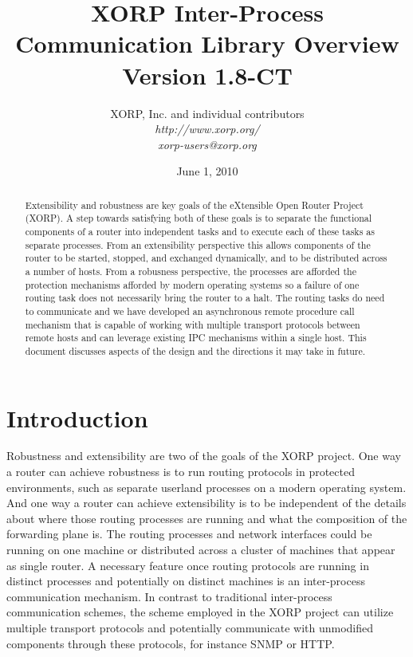 \documentclass[11pt]{article}
\begin{document}
\title{XORP Inter-Process Communication Library Overview \\
\vspace{1ex}
Version 1.8-CT}
\author{ XORP, Inc. and individual contributors		\\
         {\it http://www.xorp.org/}			\\
	 {\it xorp-users@xorp.org}
}
\date{June 1, 2010}

\maketitle


\begin{abstract}

Extensibility and robustness are key goals of the eXtensible Open
Router Project (XORP).  A step towards satisfying both of these goals
is to separate the functional components of a router into independent
tasks and to execute each of these tasks as separate processes.  From
an extensibility perspective this allows components of the router to
be started, stopped, and exchanged dynamically, and to be distributed
across a number of hosts.  From a robusness perspective, the processes
are afforded the protection mechanisms afforded by modern operating
systems so a failure of one routing task does not necessarily bring
the router to a halt. The routing tasks do need to communicate and we
have developed an asynchronous remote procedure call mechanism that is
capable of working with multiple transport protocols between remote
hosts and can leverage existing IPC mechanisms within a single
host. This document discusses aspects of the design and the directions
it may take in future.

\end{abstract}

\section{Introduction}

Robustness and extensibility are two of the goals of the XORP project.
One way a router can achieve robustness is to run routing protocols in
protected environments, such as separate userland processes on a
modern operating system.  And one way a router can achieve
extensibility is to be independent of the details about where those
routing processes are running and what the composition of the
forwarding plane is.  The routing processes and network interfaces
could be running on one machine or distributed across a cluster of
machines that appear as single router.  A necessary feature once
routing protocols are running in distinct processes and potentially on
distinct machines is an inter-process communication mechanism.  In
contrast to traditional inter-process communication schemes, the
scheme employed in the XORP project can utilize multiple transport
protocols and potentially communicate with unmodified components
through these protocols, for instance SNMP or HTTP.
\end{document}
